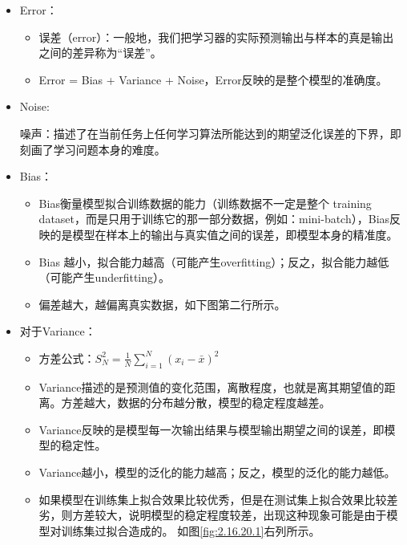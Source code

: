 \begin{itemize}

	\item Error：

		\begin{itemize}
			\itemsep0em
			\item 误差（error）：一般地，我们把学习器的实际预测输出与样本的真是输出之间的差异称为``误差''。
			\item Error = Bias + Variance + Noise，Error反映的是整个模型的准确度。
		\end{itemize}

	\item Noise:

		噪声：描述了在当前任务上任何学习算法所能达到的期望泛化误差的下界，即刻画了学习问题本身的难度。

	\item Bias：

		\begin{itemize}
			\itemsep0em
			\item Bias衡量模型拟合训练数据的能力（训练数据不一定是整个 training dataset，而是只用于训练它的那一部分数据，例如：mini-batch），Bias反映的是模型在样本上的输出与真实值之间的误差，即模型本身的精准度。
			\item Bias 越小，拟合能力越高（可能产生overfitting）；反之，拟合能力越低（可能产生underfitting）。
			\item 偏差越大，越偏离真实数据，如下图第二行所示。
		\end{itemize}
	\item 对于Variance：
		\begin{itemize}
			\item 方差公式：$S_{N}^{2}=\frac{1}{N}\sum_{i=1}^{N}(x_{i}-\bar{x})^{2}$
			\item Variance描述的是预测值的变化范围，离散程度，也就是离其期望值的距离。方差越大，数据的分布越分散，模型的稳定程度越差。
			\item Variance反映的是模型每一次输出结果与模型输出期望之间的误差，即模型的稳定性。
			\item Variance越小，模型的泛化的能力越高；反之，模型的泛化的能力越低。
			\item 如果模型在训练集上拟合效果比较优秀，但是在测试集上拟合效果比较差劣，则方差较大，说明模型的稳定程度较差，出现这种现象可能是由于模型对训练集过拟合造成的。 如图\ref{fig:2.16.20.1}右列所示。


\end{itemize}
\end{itemize}
